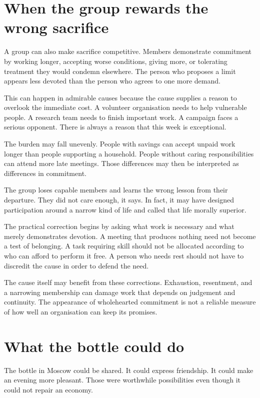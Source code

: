\documentclass[12pt,a4paper]{book}
\begin{document}
\section*{When the group rewards the wrong sacrifice}

A group can also make sacrifice competitive. Members demonstrate commitment by working longer, accepting worse conditions, giving more, or tolerating treatment they would condemn elsewhere. The person who proposes a limit appears less devoted than the person who agrees to one more demand.

This can happen in admirable causes because the cause supplies a reason to overlook the immediate cost. A volunteer organisation needs to help vulnerable people. A research team needs to finish important work. A campaign faces a serious opponent. There is always a reason that this week is exceptional.

The burden may fall unevenly. People with savings can accept unpaid work longer than people supporting a household. People without caring responsibilities can attend more late meetings. Those differences may then be interpreted as differences in commitment.

The group loses capable members and learns the wrong lesson from their departure. They did not care enough, it says. In fact, it may have designed participation around a narrow kind of life and called that life morally superior.

The practical correction begins by asking what work is necessary and what merely demonstrates devotion. A meeting that produces nothing need not become a test of belonging. A task requiring skill should not be allocated according to who can afford to perform it free. A person who needs rest should not have to discredit the cause in order to defend the need.

The cause itself may benefit from these corrections. Exhaustion, resentment, and a narrowing membership can damage work that depends on judgement and continuity. The appearance of wholehearted commitment is not a reliable measure of how well an organisation can keep its promises.

\section*{What the bottle could do}

The bottle in Moscow could be shared. It could express friendship. It could make an evening more pleasant. Those were worthwhile possibilities even though it could not repair an economy.
\end{document}
